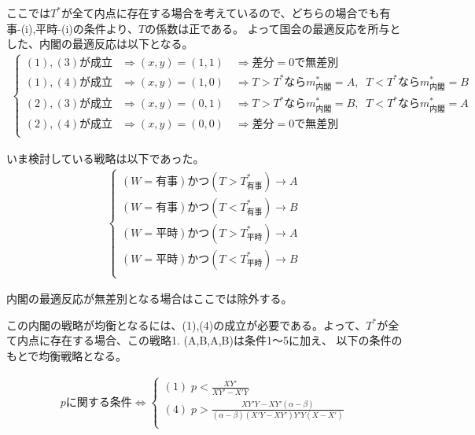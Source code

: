 \documentclass[main.tex]{subfiles}
\begin{document}
ここでは$T^*$が全て内点に存在する場合を考えているので、どちらの場合でも有事-(i),平時-(i)の条件より、$T$の係数は正である。
よって国会の最適反応を所与とした、内閣の最適反応は以下となる。
\begin{align*}
    \begin{cases}
        (1),(3)が成立 &\Rightarrow (x,y)=(1,1) \quad \Rightarrow 差分=0で無差別\\
        (1),(4)が成立 &\Rightarrow (x,y)=(1,0) \quad \Rightarrow T>T^* なら m^*_{内閣}=A,\;\; T<T^* なら m^*_{内閣}=B\\
        (2),(3)が成立 &\Rightarrow (x,y)=(0,1) \quad \Rightarrow T>T^* なら m^*_{内閣}=B,\;\; T<T^* なら m^*_{内閣}=A\\
        (2),(4)が成立 &\Rightarrow (x,y)=(0,0) \quad \Rightarrow 差分=0で無差別\\
     \end{cases}
\end{align*}

いま検討している戦略は以下であった。
\begin{align*}
    \begin{cases}
        (W=有事) かつ (T>T^*_{有事})  \rightarrow A\\
        (W=有事) かつ (T<T^*_{有事})  \rightarrow B\\
        (W=平時) かつ (T>T^*_{平時})  \rightarrow A\\
        (W=平時) かつ (T<T^*_{平時})   \rightarrow B\\
    \end{cases}
\end{align*}

内閣の最適反応が無差別となる場合はここでは除外する。

この内閣の戦略が均衡となるには、(1),(4)の成立が必要である。よって、$T^*$が全て内点に存在する場合、この戦略1. (A,B,A,B)は条件1〜5に加え、
以下の条件のもとで均衡戦略となる。


\begin{align*}
    p\text{に関する条件} \Leftrightarrow 
    \begin{cases}
        (1)\; p < \frac{XY'}{XY' - X'Y} \\[0.5em]
        (4)\; p  > \frac{XY'Y - XY'(\alpha - \beta)}{ (\alpha - \beta)( X'Y- XY')Y'Y(X - X') } \\[0.5em] 
     \end{cases}
\end{align*}
\end{document}
